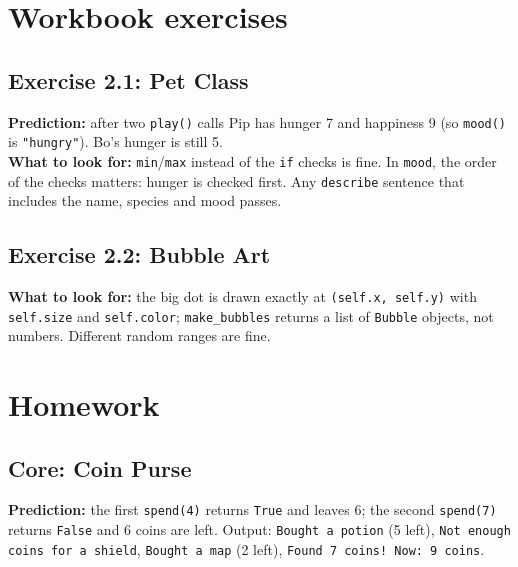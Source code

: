 
\section{Workbook exercises}
\subsection{Exercise 2.1: Pet Class}
\begin{answer}
\textbf{Prediction:} after two \texttt{play()} calls Pip has hunger 7 and happiness 9 (so \texttt{mood()} is \texttt{"hungry"}). Bo's hunger is still 5.\\
\textbf{What to look for:} \texttt{min}/\texttt{max} instead of the \texttt{if} checks is fine. In \texttt{mood}, the order of the checks matters: hunger is checked first.
Any \texttt{describe} sentence that includes the name, species and mood passes.
\end{answer}

\subsection{Exercise 2.2: Bubble Art}
\begin{answer}
\textbf{What to look for:} the big dot is drawn exactly at \texttt{(self.x, self.y)} with \texttt{self.size} and \texttt{self.color}; \texttt{make\_bubbles} returns a list of \texttt{Bubble} objects, not numbers. Different random ranges are fine.
\end{answer}

\section{Homework}
\subsection{Core: Coin Purse}
\begin{answer}
\textbf{Prediction:} the first \texttt{spend(4)} returns \texttt{True} and leaves 6; the second \texttt{spend(7)} returns \texttt{False} and 6 coins are left.
Output: \texttt{Bought a potion} (5 left), \texttt{Not enough coins for a shield}, \texttt{Bought a map} (2 left), \texttt{Found 7 coins! Now: 9 coins}.
\end{answer}

